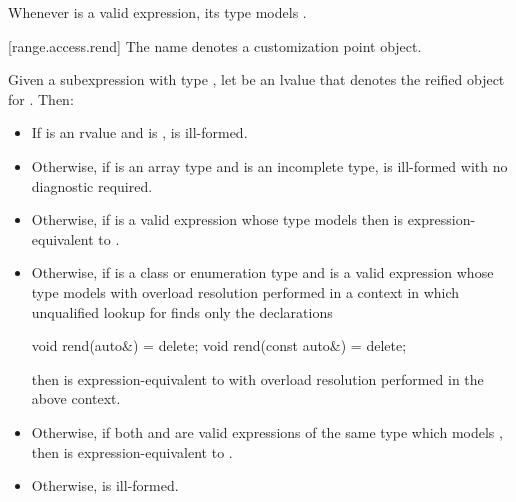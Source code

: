 \pnum
\begin{note}
Whenever  is a valid expression, its type models
.
\end{note}

[range.access.rend]{}
\pnum
The name  denotes a customization point
object.

\pnum
Given a subexpression  with type ,
let  be an lvalue that denotes the reified object for .
Then:

\begin{itemize}
\item
  If  is an rvalue and
   is ,
   is ill-formed.

\item
  Otherwise, if  is an array type and
   is an incomplete type,
   is ill-formed with no diagnostic required.

\item
  Otherwise, if 
  is a valid expression whose type models
  then  is expression-equivalent to
  .

\item
  Otherwise, if  is a class or enumeration type and
  is a valid expression whose type models
  with overload resolution performed in a context in which
  unqualified lookup for  finds only the declarations
\begin{codeblock}
void rend(auto&) = delete;
void rend(const auto&) = delete;
\end{codeblock}
  then  is expression-equivalent to
  with overload resolution performed in the above context.

\item
  Otherwise, if both  and 
  are valid expressions of the same type which models
  ,
  then  is expression-equivalent to
  .

\item
  Otherwise,  is ill-formed.
\end{itemize}

